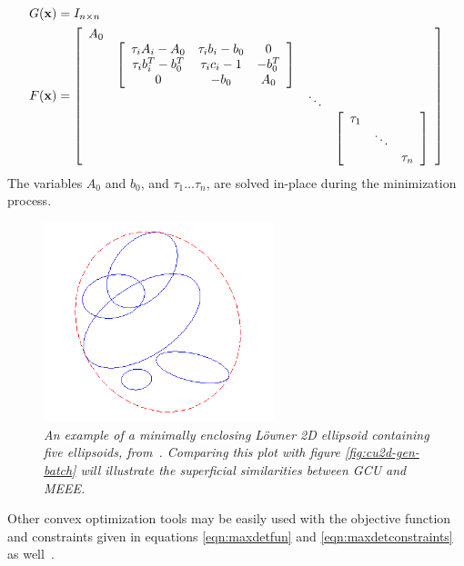 \begin{align}
    G(\mathbf{x}) &= I_{n\times n}\nonumber\\
    F(\mathbf{x}) &= \left[\begin{array}{cccc}
        A_0 &   &  &  \\
            & \left[ \begin{array}{ccc}
                \tau_i A_i - A_0   & \tau_i b_i - b_0 &  0     \\
                \tau_i b_i^T - b_0^T & \tau_i c_i -1  & -b_0^T  \\
                0     & -b_0 & A_0
                \end{array}\right]  &  &  \\
            &   & \ddots & \\
            &   &  & 
                \left[ \begin{array}{ccc}
                \tau_1 &  &  \\
                       & \ddots & \\
                       &       & \tau_n
            \end{array}\right]
    \end{array}\right]
\end{align}
The variables $A_0$ and $b_0$, and $\tau_1\dots \tau_n$, are solved in-place during the minimization process.
\begin{figure}[tbp]
    \centering\includegraphics[width=0.6\textwidth]{figures/ellipse01.png}
    \caption{\it An example of a minimally enclosing L\"owner 2D ellipsoid containing five ellipsoids,
        from~\cite{boyd04}. Comparing this plot with figure \ref{fig:cu2d-gen-batch} will illustrate the superficial
        similarities between GCU and MEEE. }
    \label{fig:ellipse}
\end{figure}

Other convex optimization tools may be easily used with the objective function and constraints given in equations
\ref{eqn:maxdetfun} and \ref{eqn:maxdetconstraints} as well~\cite{boyd04}.


